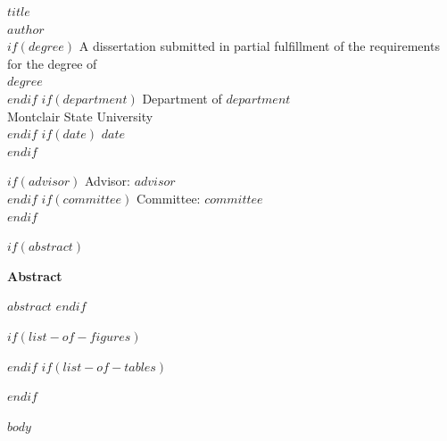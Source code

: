 \documentclass[12pt]{report}
\begin{document}
\begin{titlepage}
  \begin{center}
    \vspace*{1.5in}
    {\LARGE\textbf{$title$}\\[24pt]}
    {\large $author$ \\[12pt]}
    $if(degree)$
      {\large A dissertation submitted in partial fulfillment of the requirements for the degree of \\ $degree$ \\[8pt]}
    $endif$
    $if(department)$
      {\large Department of $department$ \\ Montclair State University \\[8pt]}
    $endif$
    $if(date)$
      {\large $date$ \\[12pt]}
    $endif$

    $if(advisor)$
      {\large Advisor: $advisor$ \\[6pt]}
    $endif$
    $if(committee)$
      {\large Committee: $committee$ \\[6pt]}
    $endif$

    \vfill
  \end{center}
\end{titlepage}

\setcounter{page}{1}
$if(abstract)$
\cleardoublepage
{}
{}
\begin{center}
  {\bfseries Abstract}\\[12pt]
\end{center}
\noindent
$abstract$
\vspace{12pt}
$endif$

\cleardoublepage
\tableofcontents
\cleardoublepage
$if(list-of-figures)$
\listoffigures
\cleardoublepage
$endif$
$if(list-of-tables)$
\listoftables
\cleardoublepage
$endif$

\cleardoublepage
{}
\setcounter{page}{1}

$body$
\end{document}
